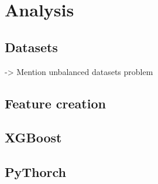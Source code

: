 \chapter{Analysis}

\section{Datasets}

-> Mention unbalanced datasets problem
\section{Feature creation}


\section{XGBoost}


\section{PyThorch}